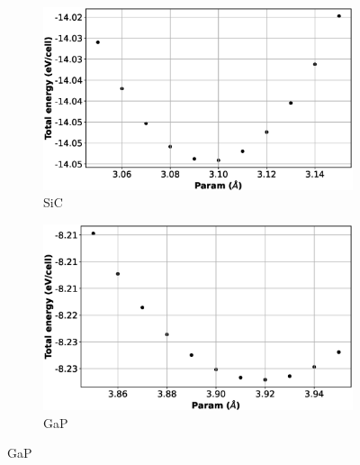 \begin{figure}[htb]
\begin{subfigure}{0.45\textwidth}
  \includegraphics[width=\linewidth]{images/sic_2d_opt.eps}
  \caption{SiC}
\end{subfigure}\hfil %
\begin{subfigure}{0.45\textwidth}
  \includegraphics[width=\linewidth]{images/gap_2d_opt.eps}
  \caption{GaP}
\end{subfigure}\hfil %

\medskip


\end{figure}

